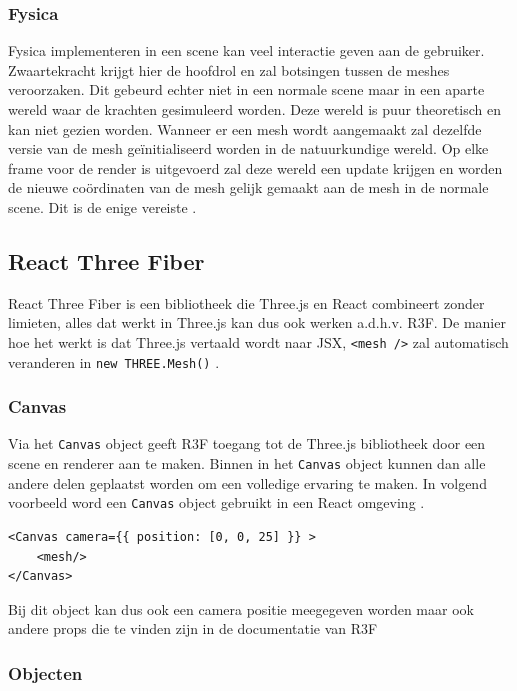 \subsubsection{Fysica}

Fysica implementeren in een scene kan veel interactie geven aan de gebruiker. Zwaartekracht krijgt hier de hoofdrol en zal botsingen tussen de meshes veroorzaken. Dit gebeurd echter niet in een normale scene maar in een aparte wereld waar de krachten gesimuleerd worden. Deze wereld is puur theoretisch en kan niet gezien worden. Wanneer er een mesh wordt aangemaakt zal dezelfde versie van de mesh geïnitialiseerd worden in de natuurkundige wereld.
Op elke frame voor de render is uitgevoerd zal deze wereld een update krijgen en worden de nieuwe coördinaten van de mesh gelijk gemaakt aan de mesh in de normale scene. Dit is de enige vereiste \autocite{Simon2023}.
\newpage
\subsection{React Three Fiber}

React Three Fiber is een bibliotheek die Three.js en React combineert zonder limieten, alles dat werkt in Three.js kan dus ook werken a.d.h.v. R3F. De manier hoe het werkt is dat Three.js vertaald wordt naar JSX, \texttt{<mesh />} zal automatisch veranderen in \texttt{new THREE.Mesh()} \autocite{reactThreeFiber2023}.

\subsubsection{Canvas}

Via het \texttt{Canvas} object geeft R3F toegang tot de Three.js bibliotheek door een scene en renderer aan te maken. Binnen in het  \texttt{Canvas} object kunnen dan alle andere delen geplaatst worden om een volledige ervaring te maken. In volgend voorbeeld word een  \texttt{Canvas} object gebruikt in een React omgeving \autocite{reactThreeFiber2023}.

\begin{lstlisting}
<Canvas camera={{ position: [0, 0, 25] }} >
	<mesh/>
</Canvas>
\end{lstlisting}

Bij dit object kan dus ook een camera positie meegegeven worden maar ook andere props die te vinden zijn in de documentatie van R3F

\subsubsection{Objecten}

